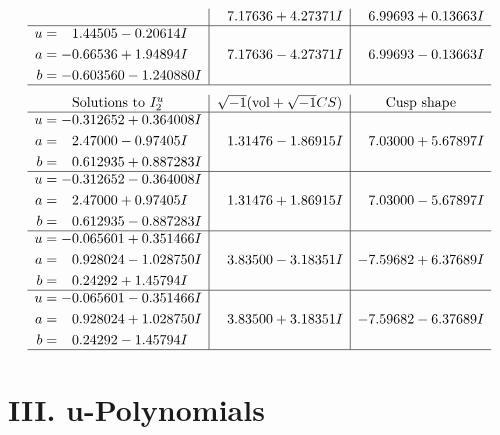 \documentclass[1p]{elsarticle_modified}
\theoremstyle{definition}
\newcommand{\I}{\sqrt{-1}}
\begin{document}
$$\begin{array}{c|c|c}
 & \phantom{-}7.17636 + 4.27371 I & \phantom{-}6.99693 + 0.13663 I \\ \hline\begin{aligned}
u &= \phantom{-}1.44505 - 0.20614 I \\
a &= -0.66536 + 1.94894 I \\
b &= -0.603560 - 1.240880 I\end{aligned}
 & \phantom{-}7.17636 - 4.27371 I & \phantom{-}6.99693 - 0.13663 I\\
 \hline 
 \end{array}$$\newpage$$\begin{array}{c|c|c}  
\text{Solutions to }I^u_{2}& \I (\text{vol} + \sqrt{-1}CS) & \text{Cusp shape}\\
 \hline 
\begin{aligned}
u &= -0.312652 + 0.364008 I \\
a &= \phantom{-}2.47000 - 0.97405 I \\
b &= \phantom{-}0.612935 + 0.887283 I\end{aligned}
 & \phantom{-}1.31476 - 1.86915 I & \phantom{-}7.03000 + 5.67897 I \\ \hline\begin{aligned}
u &= -0.312652 - 0.364008 I \\
a &= \phantom{-}2.47000 + 0.97405 I \\
b &= \phantom{-}0.612935 - 0.887283 I\end{aligned}
 & \phantom{-}1.31476 + 1.86915 I & \phantom{-}7.03000 - 5.67897 I \\ \hline\begin{aligned}
u &= -0.065601 + 0.351466 I \\
a &= \phantom{-}0.928024 - 1.028750 I \\
b &= \phantom{-}0.24292 + 1.45794 I\end{aligned}
 & \phantom{-}3.83500 - 3.18351 I & -7.59682 + 6.37689 I \\ \hline\begin{aligned}
u &= -0.065601 - 0.351466 I \\
a &= \phantom{-}0.928024 + 1.028750 I \\
b &= \phantom{-}0.24292 - 1.45794 I\end{aligned}
 & \phantom{-}3.83500 + 3.18351 I & -7.59682 - 6.37689 I\\
 \hline 
 \end{array}$$\newpage
\newpage\renewcommand{\arraystretch}{1}
\centering \section*{ III. u-Polynomials}
\end{document}
